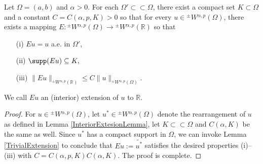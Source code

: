 \documentclass[leqno,final]{siamltex}
\numberwithin{equation}{section}
\renewcommand{\(}{\bigl(}
\renewcommand{\)}{\bigr)}
\newcommand{\R}{\mathbb{R}}
\begin{document}
    \begin{theorem}\label{InteriorExtension}
    	Let $\Omega=(a,b)$ and $\alpha>0$. 
        For each $\Omega' \subset\subset \Omega$,   there exist  a compact set $K\subset \Omega$  and  a constant $C = C(\alpha ,p, K) >0$ so that for every $u \in {^{\pm}}{W}{^{\alpha,p}}(\Omega)$,  
        there exists a mapping $E: {^{\pm}}{W}{^{\alpha,p}}(\Omega) \rightarrow {^{\pm}}{W}{^{\alpha,p}}(\R)$ so that 
        \begin{enumerate}
            \item[{\rm (i)}]  ${Eu} = u$  a.e. in $\Omega'$,
            \item[{\rm (ii)}] $\supp(E{u})\subseteq K,$
            \item[{\rm (iii)}] $\|E{u}\|_{{^{\pm}}{W}{^{\alpha,p}}(\R)} \leq C \|u\|_{{^{\pm}}{W}{^{\alpha,p}}(\Omega)}.$
        \end{enumerate}
        We call $Eu$ an (interior) extension of $u$ to $\R$. 
        
    \end{theorem}
 
    \begin{proof}
        For $u\in {^{\pm}}{W}{^{\alpha,p}}(\Omega) $, let $u^* \in {^{\pm}}{W}{^{\alpha,p}}(\Omega) $ denote the rearrangement of $u$  as defined in Lemma \ref{InteriorExtesionLemma},  let  $K\subset\subset \Omega$ and $C(\alpha, K)$ be the same as well. Since $u^*$ has a  compact support in $\Omega$,  
         we can invoke Lemma \ref{TrivialExtension}  to conclude that  $E{u} :=
        \widetilde{u^*}$ satisfies the desired properties (i)--(iii) with $C=C(\alpha,p,K) C(\alpha, K)$. The proof is complete. 
    \end{proof}
\end{document}
